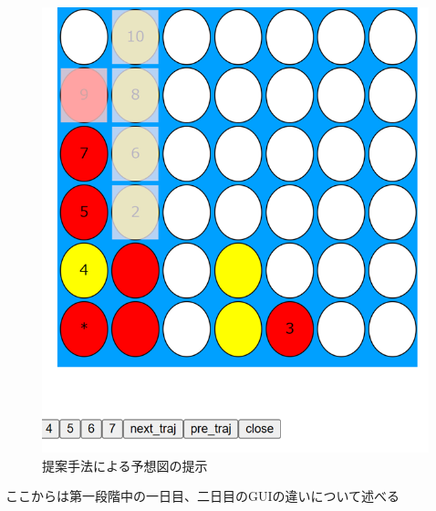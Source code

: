 \begin{figure}[t]
	\centering
	\includegraphics[width=\linewidth]{./figure/multi.png}
	\caption{提案手法による予想図の提示}
	\label{fig:multi}
\end{figure}
ここからは第一段階中の一日目、二日目のGUIの違いについて述べる
